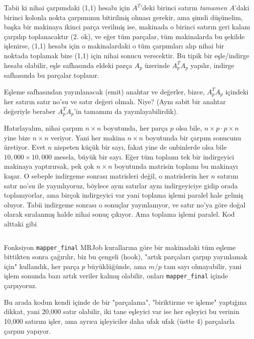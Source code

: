 \documentclass[12pt,fleqn]{article}\usepackage{../../common}
\begin{document}
Tabii ki nihai çarpımdaki (1,1) hesabı için $A^T$'deki birinci satırın {\em
  tamamen} $A$'daki birinci kolonla nokta çarpımının bitirilmiş olması gerekir,
ama şimdi düşünelim, başka bir makinaya ikinci parça verilmiş ise, makinada o
birinci satırın geri kalanı çarpılıp toplanacaktır (2. ok), ve eğer tüm
parçalar, tüm makinalarda bu şekilde işlenirse, (1,1) hesabı için o
makinalardaki o tüm çarpımları alıp nihai bir noktada toplamak bize (1,1) için
nihai sonucu verecektir. Bu tipik bir eşle/indirge hesabı olabilir, eşle
safhasında eldeki parça $A_p$ üzerinde $A_p^T A_p$ yapılır, indirge safhasında
bu parçalar toplanır.

Eşleme safhasından yayınlanacak (emit) anahtar ve değerler, bizce, $A_p^T A_p$
içindeki her satırın satır no'su ve satır değeri olmalı. Niye? (Aynı sabit bir
anahtar değeriyle beraber $A_p^T A_p$'in tamamını da yayınlayabilirdik).

Hatırlayalım, nihai çarpım $n \times n$ boyutunda, her parça $p$ olsa bile, $n
\times p \cdot p \times n$ yine bize $n \times n$ veriyor. Yani her makina $n
\times n$ boyutunda bir çarpım sonucunu üretiyor. Evet $n$ nispeten küçük bir
sayı, fakat yine de onbinlerde olsa bile $10,000 \times 10,000$ mesela, büyük
bir sayı. Eğer tüm toplamı tek bir indirgeyici makinaya yaptırırsak, pek çok $n
\times n$ boyutunda matrisin toplamı bu makinayı kaşar. O sebeple indirgeme
sonrası matrisleri değil, o matrislerin her $n$ satırını satır no'su ile
yayınlıyoruz, böylece aynı satırlar aynı indirgeyiciye gidip orada
toplanıyorlar, ama birçok indirgeyici var yani toplama işlemi paralel hale
gelmiş oluyor. Tabii indirgeme sonrası o sonuçlar yayınlanıyor, ve satır no'ya
göre doğal olarak sıralanmış halde nihai sonuç çıkıyor.  Ama toplama işlemi
paralel. Kod alttaki gibi

\inputminted[fontsize=\footnotesize]{python}{AtA.py}

Fonksiyon \verb!mapper_final! MRJob kurallarına göre bir makinadaki tüm eşleme
bittikten sonra çağırılır, biz bu çengeli (hook), "artık parçaları çarpıp
yayınlamak için" kullandık, her parça $p$ büyüklüğünde, ama $m / p$ tam sayı
olmayabilir, yani işlem sonunda bazı artık veriler kalmış olabilir, onları
\verb!mapper_final!  içinde çarpıyoruz.

Bu arada kodun kendi içinde de bir "parçalama", "biriktirme ve işleme" yaptığına
dikkat, yani 20,000 satır olabilir, iki tane eşleyici var ise her eşleyici bu
verinin 10,000 satırını işler, ama ayrıca işleyiciler daha ufak ufak (üstte 4)
parçalarla çarpım yapıyor.
\end{document}
